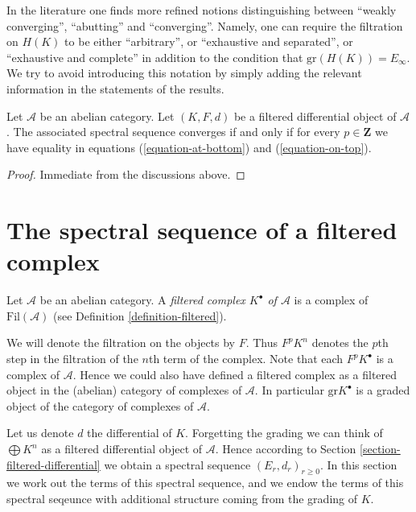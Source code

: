 \noindent
In the literature one finds more refined notions distinguishing between
``weakly converging'', ``abutting'' and ``converging''. Namely, one can
require the filtration on $H(K)$ to be either ``arbitrary'', or
``exhaustive and separated'', or ``exhaustive and complete'' in addition
to the condition that $\text{gr}(H(K)) = E_\infty$. We try to avoid introducing
this notation by simply adding the relevant information in the statements
of the results.

\begin{lemma}
\label{lemma-filtered-differential-ss-converges}
Let $\mathcal{A}$ be an abelian category.
Let $(K, F, d)$ be a filtered differential object of $\mathcal{A}$.
The associated spectral sequence converges if and only if for every
$p \in \mathbf{Z}$ we have equality in equations
(\ref{equation-at-bottom}) and (\ref{equation-on-top}).
\end{lemma}

\begin{proof}
Immediate from the discussions above.
\end{proof}














\section{The spectral sequence of a filtered complex}
\label{section-filtered-complex}

\begin{definition}
\label{definition-filtered-complex}
Let $\mathcal{A}$ be an abelian category.
A {\it filtered complex $K^\bullet$ of $\mathcal{A}$}
is a complex of $\text{Fil}(\mathcal{A})$ (see
Definition \ref{definition-filtered}).
\end{definition}

\noindent
We will denote the filtration on the objects by $F$. Thus
$F^pK^n$ denotes the $p$th step in the filtration of the $n$th term of the
complex. Note that each $F^pK^\bullet$ is a complex of $\mathcal{A}$.
Hence we could also have defined a filtered complex as a filtered object
in the (abelian) category of complexes of $\mathcal{A}$.
In particular $\text{gr} K^\bullet$ is a graded object of the
category of complexes of $\mathcal{A}$.

\medskip\noindent
Let us denote $d$ the differential of $K$. Forgetting the grading
we can think of $\bigoplus K^n$ as a filtered differential object of
$\mathcal{A}$. Hence according to Section \ref{section-filtered-differential}
we obtain a spectral sequence $(E_r, d_r)_{r \geq 0}$.
In this section we work out the terms
of this spectral sequence, and we endow the terms of this spectral seqeunce
with additional structure coming from the grading of $K$.

